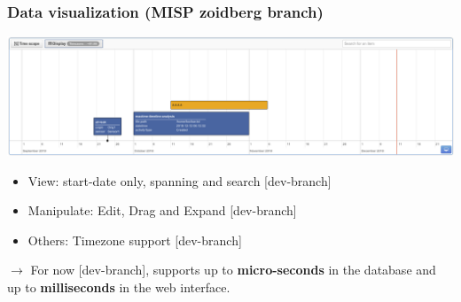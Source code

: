 \begin{frame}
        \frametitle{Data visualization (MISP zoidberg branch)}
    \includegraphics[width=1.0\linewidth]{pics/timeline.png}
    \begin{itemize}
        \item View: start-date only, spanning and search [dev-branch]
        \item Manipulate: Edit, Drag and Expand [dev-branch]
        \item Others: Timezone support [dev-branch]
    \end{itemize}

    \vspace{0.3cm}
    $\rightarrow$ For now [dev-branch], supports up to \textbf{micro-seconds} in the database and up to \textbf{milliseconds} in the web interface.
\end{frame}
